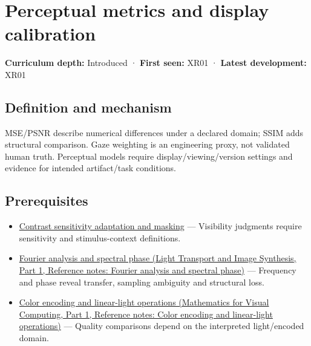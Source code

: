 \hypertarget{appendix-b2c1846508bf}{}\label{referencestart:appendix-b2c1846508bf}
\section{Perceptual metrics and display calibration}\label{appendix-b2c1846508bf-perceptual-metrics-and-display-calibration}

\hypertarget{appendix-b2c1846508bf-perceptual-metrics-and-display-calibration}{}

\textbf{Curriculum depth:} Introduced · \textbf{First seen:} XR01 · \textbf{Latest development:} XR01

\begin{allmightroledefinition}

\subsection{Definition and mechanism}\label{appendix-b2c1846508bf-definition-and-mechanism}

\hypertarget{appendix-b2c1846508bf-definition-and-mechanism}{}

MSE/PSNR describe numerical differences under a declared domain; SSIM adds structural comparison. Gaze weighting is an engineering proxy, not validated human truth. Perceptual models require display/viewing/version settings and evidence for intended artifact/task conditions.

\end{allmightroledefinition}

\subsection{Prerequisites}\label{appendix-b2c1846508bf-prerequisites}

\hypertarget{appendix-b2c1846508bf-prerequisites}{}

\begin{itemize}
\tightlist
\item
  \hyperref[appendix-b3aa9e8e01ad]{Contrast sensitivity adaptation and masking} --- Visibility judgments require sensitivity and stimulus-context definitions.
\item
  \href{../04-Light-Transport-and-Image-Synthesis-P01/main.pdf\#appendix-b60686ba06a1}{Fourier analysis and spectral phase (Light Transport and Image Synthesis, Part 1, Reference notes: Fourier analysis and spectral phase)} --- Frequency and phase reveal transfer, sampling ambiguity and structural loss.
\item
  \href{../02-Mathematics-for-Visual-Computing-P01/main.pdf\#appendix-a9f83ad40792}{Color encoding and linear-light operations (Mathematics for Visual Computing, Part 1, Reference notes: Color encoding and linear-light operations)} --- Quality comparisons depend on the interpreted light/encoded domain.
\end{itemize}

